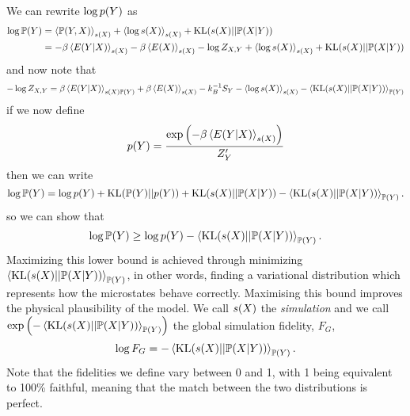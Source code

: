 \documentclass[]{article}
\begin{document}
We can rewrite $\log p(Y)$ as
\begin{align}
    \log \mathbb{P}(Y) & = \left\langle \mathbb{P}(Y, X) \right\rangle_{s(X )} +  \left\langle \log s(X) \right\rangle_{s(X)} +  \text{KL}(s(X)||\mathbb{P}(X|Y)) \nonumber \\
    & = -\beta\left\langle  E(Y | X) \right\rangle_{s(X)}  -\beta\left\langle E(X) \right\rangle_{s(X)} - \log Z_{X,Y} + \left\langle \log s(X) \right\rangle_{s(X)} +  \text{KL}(s(X)||\mathbb{P}(X|Y)) \label{eqn-true-log-likelihood-1}
\end{align}
and now note that
\[
-  \log Z_{X,Y} = \beta\left\langle E(Y | X) \right\rangle_{s(X)\mathbb{P}(Y)} + \beta\left\langle E(X) \right\rangle_{s(X )} - k_B^{-1}S_Y -\left\langle \log s(X) \right\rangle_{s(X)} - \left\langle \text{KL}(s(X) || \mathbb{P}(X | Y)) \right\rangle_{\mathbb{P}(Y)}
\]
if we now define
\[
p(Y) = \frac{\exp\left(-\beta \left\langle E(Y | X) \right\rangle_{s(X)}\right)}{Z^\prime_Y}
\]
then we can write
\[
\log \mathbb{P}(Y) = \log p(Y)  + \text{KL}(\mathbb{P}(Y)||p(Y))  + \text{KL}(s(X)||\mathbb{P}(X|Y)) - \left\langle \text{KL}(s(X)||\mathbb{P}(X|Y)) \right\rangle_{\mathbb{P}(Y)}. 
\]
so we can show that
\[
\log \mathbb{P}(Y) \geq \log p(Y) - \left\langle \text{KL}(s(X)||\mathbb{P}(X|Y)) \right\rangle_{\mathbb{P}(Y)}.
\]
Maximizing this lower bound is achieved through minimizing $\left\langle \text{KL}(s(X)||\mathbb{P}(X|Y)) \right\rangle_{\mathbb{P}(Y)}$, in other words, finding a variational distribution which represents how the microstates behave correctly. Maximising this bound improves the physical plausibility of the model. We call $s(X)$ the \emph{simulation} and we call $\exp\left(- \left\langle \text{KL}(s(X)||\mathbb{P}(X|Y)) \right\rangle_{\mathbb{P}(Y)}\right)$ the global simulation fidelity, $F_G$,
\[
\log F_G = -\left\langle \text{KL}(s(X)||\mathbb{P}(X|Y)) \right\rangle_{\mathbb{P}(Y)}.
\]
Note that the fidelities we define vary between 0 and 1, with 1 being equivalent to 100\% faithful, meaning that the match between the two distributions is perfect. 
\end{document}

